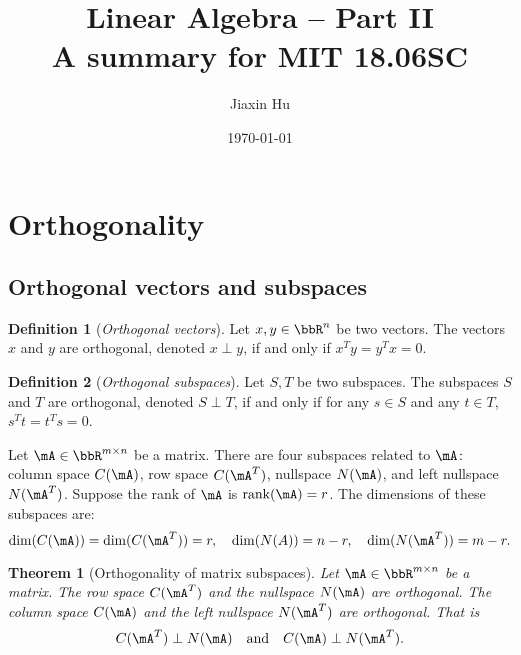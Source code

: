 \documentclass[11pt]{article}
\title{\textbf{Linear Algebra -- Part II}\\A summary for MIT 18.06SC}
\date{\today}
\author{%
Jiaxin Hu
}
\DeclareMathOperator{\rank}{rank}
\theoremstyle{plain}
\newtheorem{thm}{Theorem}[section]
\theoremstyle{definition}
\newtheorem{defn}{Definition}
\begin{document}

\maketitle


\section{Orthogonality}

\subsection{Orthogonal vectors and subspaces}
\begin{defn}[\textit{Orthogonal vectors}]\label{def:vortho}
	Let  $x,y \in \bbR^{n}$ be two vectors. The vectors $x$ and $y$ are orthogonal,  denoted $x \perp y$, if and only if $x^T y = y^T x = 0$.
\end{defn}

\begin{defn}[\textit{Orthogonal subspaces}]\label{def:sortho}
	Let  $S,T$ be two subspaces. The subspaces $S$ and $T$ are orthogonal,  denoted $S \perp T$, if and only if for any $s \in S$ and any $ t \in T$, $s^T t = t^T s = 0$.
\end{defn}

Let $\mA \in \bbR^{m \times n}$ be a matrix. There are four subspaces related to $\mA\colon$ column space $C(\mA)$, row space $C(\mA^T)$, nullspace $N(\mA)$, and left nullspace $N(\mA^T)$. Suppose the rank of $\mA$ is $\rank(\mA) = r$. The dimensions of these subspaces are: 
\[ \dim(C(\mA)) = \dim(C(\mA^T)) = r,\quad  \dim(N(A)) = n-r,\quad \dim(N(\mA^T)) = m-r. \] 

\begin{thm}[Orthogonality of matrix subspaces]\label{thm:ortho}
	Let  $\mA \in \bbR^{m \times n}$ be a matrix. The row space $C(\mA^T)$ and the nullspace $N(\mA)$ are orthogonal. The column space $C(\mA)$ and the left nullspace $N(\mA^T)$ are orthogonal. That is
	\[ C(\mA^T) \perp N(\mA)\quad  \text{and} \quad C(\mA) \perp N(\mA^T).  \]
\end{thm}
\end{document}
